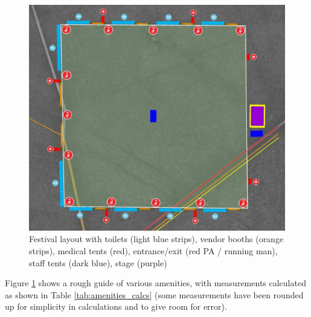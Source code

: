         \begin{figure}[H]
            \centering
            \includegraphics[width=\textwidth]{Images/festival_close_up.jpg}
            \caption{Festival layout with toilets (light blue strips), vendor booths (orange strips), medical tents (red), entrance/exit (red PA / running man), staff tents (dark blue), stage (purple)}
            \label{fig:festival_close_up}
        \end{figure}

        Figure \ref{fig:festival_close_up} shows a rough guide of various amenities, with measurements calculated as shown in Table \ref{tab:amenities_calcs} (some measurements have been rounded up for simplicity in calculations and to give room for error).

